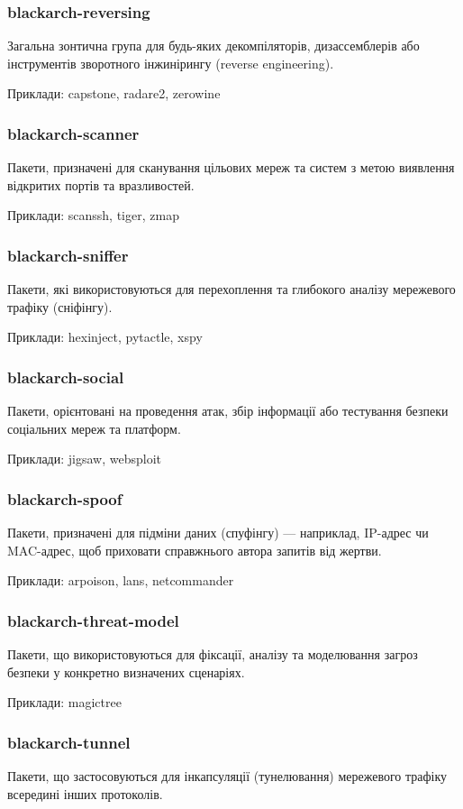 \documentclass[a4paper, oneside, 11pt]{book}
\begin{document}
\subsubsection{blackarch-reversing}
Загальна зонтична група для будь-яких декомпіляторів, дизассемблерів або інструментів зворотного інжинірингу (reverse engineering).

Приклади: capstone, radare2, zerowine

\subsubsection{blackarch-scanner}
Пакети, призначені для сканування цільових мереж та систем з метою виявлення відкритих портів та вразливостей.

Приклади: scanssh, tiger, zmap

\subsubsection{blackarch-sniffer}
Пакети, які використовуються для перехоплення та глибокого аналізу мережевого трафіку (сніфінгу).

Приклади: hexinject, pytactle, xspy

\subsubsection{blackarch-social}
Пакети, орієнтовані на проведення атак, збір інформації або тестування безпеки соціальних мереж та платформ.

Приклади: jigsaw, websploit

\subsubsection{blackarch-spoof}
Пакети, призначені для підміни даних (спуфінгу) --- наприклад, IP-адрес чи MAC-адрес, щоб приховати справжнього автора запитів від жертви.

Приклади: arpoison, lans, netcommander

\subsubsection{blackarch-threat-model}
Пакети, що використовуються для фіксації, аналізу та моделювання загроз безпеки у конкретно визначених сценаріях.

Приклади: magictree

\subsubsection{blackarch-tunnel}
Пакети, що застосовуються для інкапсуляції (тунелювання) мережевого трафіку всередині інших протоколів.
\end{document}

